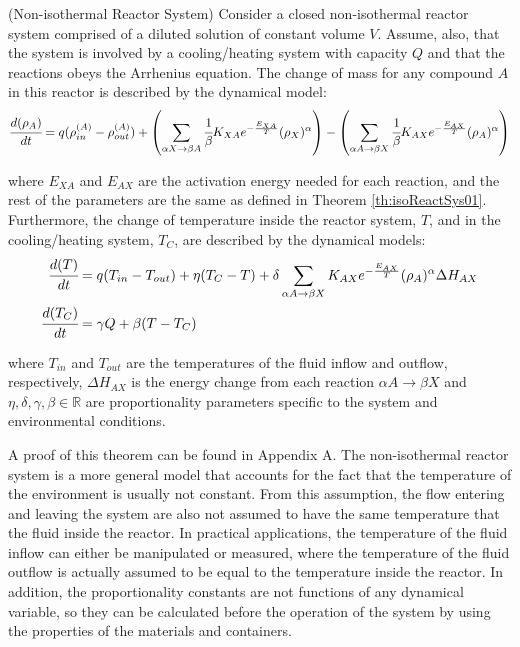 \documentclass[a4paper,11pt]{book}
\numberwithin{figure}{chapter}
\numberwithin{equation}{chapter}
\numberwithin{table}{chapter}
\newtheorem{theorem}{Theorem}[chapter]
\theoremstyle{definition}
\newcounter{boxed-theorem}
\newenvironment{boxed-theorem}[1]
{\begin{shaded} \begin{theorem}{#1}}
{\end{theorem} \end{shaded}}
\newcounter{boxed-definition}
\begin{document}
\begin{boxed-theorem}{(Non-isothermal Reactor System)} \label{th:exoReactSys01}
    Consider a closed non-isothermal reactor system comprised of a diluted solution of constant volume $V$. Assume, also, that the system is involved by a cooling/heating system with capacity $Q$ and that the reactions obeys the Arrhenius equation. The change of mass for any compound $A$ in this reactor is described by the dynamical model:
    \begin{equation} \label{eq:exoModel1}
    		\cfrac{d (\rho_A)}{dt} = q (\rho^{(A)}_{in} - \rho^{(A)}_{out}) + \left( \sum_{\alpha X \rightarrow \beta A} \cfrac{1}{\beta} K_{XA} e^{-\frac{E_{XA}}{T}} (\rho_X)^{\alpha} \right) - \left(\sum_{\alpha A \rightarrow \beta X} \cfrac{1}{\beta} K_{AX} e^{-\frac{E_{AX}}{T}} (\rho_A)^{\alpha} \right)
    \end{equation}

    \noindent where $E_{XA}$ and $E_{AX}$ are the activation energy needed for each reaction, and the rest of the parameters are the same as defined in Theorem \ref{th:isoReactSys01}. Furthermore, the change of temperature inside the reactor system, $T$, and in the cooling/heating system, $T_C$, are described by the dynamical models:
    \begin{align} \label{eq:exoModel2}
    \begin{split}
        \cfrac{d(T)}{dt} &= q(T_{in} - T_{out}) + \eta (T_C - T) + \delta \sum_{\alpha A \rightarrow \beta X} K_{AX} e^{-\frac{E_{AX}}{T}} (\rho_A)^{\alpha} \Delta H_{AX} \\
        \cfrac{d(T_C)}{dt} &= \gamma Q + \beta (T - T_C) 
    \end{split}
    \end{align}
    
    \noindent where $T_{in}$ and $T_{out}$ are the temperatures of the fluid inflow and outflow, respectively, $\Delta H_{AX}$ is the energy change from each reaction $\alpha A \rightarrow \beta X$ and $\eta, \delta, \gamma, \beta \in \mathbb{R}$ are proportionality parameters specific to the system and environmental conditions.
\end{boxed-theorem}

A proof of this theorem can be found in Appendix A. The non-isothermal reactor system is a more general model that accounts for the fact that the temperature of the environment is usually not constant. From this assumption, the flow entering and leaving the system are also not assumed to have the same temperature that the fluid inside the reactor. In practical applications, the temperature of the fluid inflow can either be manipulated or measured, where the temperature of the fluid outflow is actually assumed to be equal to the temperature inside the reactor. In addition, the proportionality constants are not functions of any dynamical variable, so they can be calculated before the operation of the system by using the properties of the materials and containers.
\end{document}
